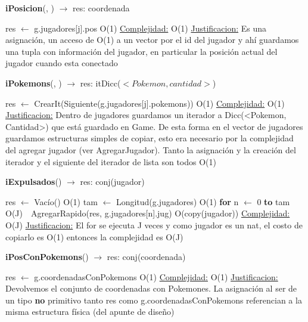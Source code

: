\begin{Algoritmos}
\begin{algorithm}[H]{\textbf{iPosicion}(, ) $\to$ res: coordenada}
	\begin{algorithmic}[1]
		\State res $\gets$ g.jugadores[j].pos \Comment O(1)
		\medskip
		\Statex \underline{Complejidad:} O(1)
		\Statex \underline{Justificacion:} Es una asignaci\'on, un acceso de O(1) a un vector por el id del jugador y ah\'i guardamos una tupla con informaci\'on del jugador, en particular la posici\'on actual del jugador cuando esta conectado
	\end{algorithmic}
\end{algorithm}

\begin{algorithm}[H]{\textbf{iPokemons}(, ) $\to$ res: itDicc($<Pokemon, cantidad>$)}
	\begin{algorithmic}[1]
		\State res $\gets$ CrearIt(Siguiente(g.jugadores[j].pokemons)) \Comment O(1)
		\medskip
		\Statex \underline{Complejidad:} O(1)
		\Statex \underline{Justificacion:} Dentro de jugadores guardamos un iterador a Dicc(<Pokemon, Cantidad>) que est\'a guardado en Game. De esta forma en el vector de jugadores guardamos estructuras simples de copiar, esto era necesario por la complejidad del agregar jugador (ver AgregarJugador). Tanto la asignaci\'on y la creaci\'on del iterador y el siguiente del iterador de lista son todos O(1)
	\end{algorithmic}
\end{algorithm}

\begin{algorithm}[H]{\textbf{iExpulsados}() $\to$ res: conj(jugador)}
	\begin{algorithmic}[1]
		\State res $\gets$ Vac\'io() \Comment O(1)
		\State tam $\gets$ Longitud(g.jugadores) \Comment O(1)
		\State \textbf{for} n $\gets$ 0 \textbf{to} tam \Comment O(J)
		\State \,\,\,\,AgregarRapido(res, g.jugadores[n].jug) \Comment O(copy(jugador))
		\medskip
		\Statex \underline{Complejidad:} O(J)
		\Statex \underline{Justificacion:} El for se ejecuta J veces y como jugador es un nat, el costo de copiarlo es O(1) entonces la complejidad es O(J)
	\end{algorithmic}
\end{algorithm}

\begin{algorithm}[H]{\textbf{iPosConPokemons}() $\to$ res: conj(coordenada)}
	\begin{algorithmic}[1]
		\State res $\gets$ g.coordenadasConPokemons \Comment O(1)
		\medskip
		\Statex \underline{Complejidad:} O(1)
		\Statex \underline{Justificacion:} Devolvemos el conjunto de coordenadas con Pokemones. La asignaci\'on al ser de un tipo \textbf{no} primitivo tanto res como g.coordenadasConPokemons referencian a la misma estructura f\'isica (del apunte de dise\~no)
	\end{algorithmic}
\end{algorithm}


\end{Algoritmos}

